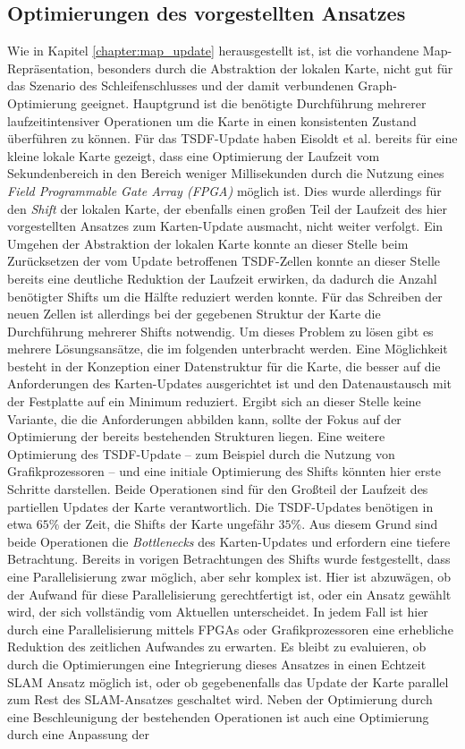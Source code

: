 \subsection{Optimierungen des vorgestellten Ansatzes}

Wie in Kapitel \ref{chapter:map_update} herausgestellt ist, ist die vorhandene Map-Repräsentation, besonders durch die Abstraktion der lokalen Karte, nicht gut für das Szenario des Schleifenschlusses und der damit verbundenen Graph-Optimierung geeignet. Hauptgrund ist die benötigte Durchführung mehrerer laufzeitintensiver Operationen um die Karte in einen konsistenten Zustand überführen zu können. Für das TSDF-Update haben Eisoldt et al. \cite{HTSDF} bereits für eine kleine lokale Karte gezeigt, dass eine Optimierung der Laufzeit vom Sekundenbereich in den Bereich weniger Millisekunden durch die Nutzung eines \emph{Field Programmable Gate Array (FPGA)} möglich ist. Dies wurde allerdings für den \emph{Shift} der lokalen Karte, der ebenfalls einen großen Teil der Laufzeit des hier vorgestellten Ansatzes zum Karten-Update ausmacht, nicht weiter verfolgt. Ein Umgehen der Abstraktion der lokalen Karte konnte an dieser Stelle beim Zurücksetzen der vom Update betroffenen TSDF-Zellen konnte an dieser Stelle bereits eine deutliche Reduktion der Laufzeit erwirken, da dadurch die Anzahl benötigter Shifts um die Hälfte reduziert werden konnte. Für das Schreiben der neuen Zellen ist allerdings bei der gegebenen Struktur der Karte die Durchführung mehrerer Shifts notwendig. Um dieses Problem zu lösen gibt es mehrere Lösungsansätze, die im folgenden unterbracht werden. Eine Möglichkeit besteht in der Konzeption einer Datenstruktur für die Karte, die besser auf die Anforderungen des Karten-Updates ausgerichtet ist und den Datenaustausch mit der Festplatte auf ein Minimum reduziert. Ergibt sich an dieser Stelle keine Variante, die die Anforderungen abbilden kann, sollte der Fokus auf der Optimierung der bereits bestehenden Strukturen liegen. Eine weitere Optimierung des TSDF-Update -- zum Beispiel durch die Nutzung von Grafikprozessoren -- und eine initiale Optimierung des Shifts könnten hier erste Schritte darstellen. Beide Operationen sind für den Großteil der Laufzeit des partiellen Updates der Karte verantwortlich. Die TSDF-Updates benötigen in etwa $65\%$ der Zeit, die Shifts der Karte ungefähr $35\%$. Aus diesem Grund sind beide Operationen die \emph{Bottlenecks} des Karten-Updates und erfordern eine tiefere Betrachtung. Bereits in vorigen Betrachtungen des Shifts wurde festgestellt, dass eine Parallelisierung zwar möglich, aber sehr komplex ist. Hier ist abzuwägen, ob der Aufwand für diese Parallelisierung gerechtfertigt ist, oder ein Ansatz gewählt wird, der sich vollständig vom Aktuellen unterscheidet. In jedem Fall ist hier durch eine Parallelisierung mittels FPGAs oder Grafikprozessoren eine erhebliche Reduktion des zeitlichen Aufwandes zu erwarten. Es bleibt zu evaluieren, ob durch die Optimierungen eine Integrierung dieses Ansatzes in einen Echtzeit SLAM Ansatz möglich ist, oder ob gegebenenfalls das Update der Karte parallel zum Rest des SLAM-Ansatzes geschaltet wird. Neben der Optimierung durch eine Beschleunigung der bestehenden Operationen ist auch eine Optimierung durch eine Anpassung der 